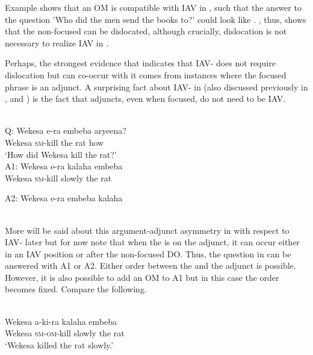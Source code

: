 \documentclass[output=paper,newtxmath,modfonts,nonflat,hidelinks]{langsci/langscibook}
\begin{document}
Example  shows that an OM is compatible with IAV  in , such that the answer to the question 'Who did the men send the books to?' could look like . , thus, shows that the non-focused  can be dislocated, although crucially, dislocation is not necessary to realize IAV  in .

Perhaps, the strongest evidence that indicates that  IAV- does not require dislocation but can co-occur with it comes from instances where the focused phrase is an adjunct. A surprising fact about IAV- in  (also discussed previously in \citet{Carstens2013}, and \citet{safirforthcoming}) is the fact that  adjuncts, even when focused, do not need to be IAV.

\ea\label{ex:selvanathan:10}
\\

Q: \gll Wekesa   e-ra     embeba   aryeena? \\
	Wekesa   \textsc{sm}{}-kill   {the rat}    how \\
\glt \-\hspace{0.5cm}`How did Wekesa kill the rat?' \\

A1: {\gll Wekesa    e-ra   kalaha   embeba \\
Wekesa   \textsc{sm}{}-kill   slowly    {the rat} \\}

A2: {\gll Wekesa    e-ra   embeba   kalaha  \\
\\}
\z

More will be said about this argument-adjunct asymmetry in  with respect to IAV- later but for now note that when the  is on the adjunct, it can occur either in an IAV position or after the non-focused DO. Thus, the question in  can be answered with A1 or A2. Either order between the  and the adjunct is possible. However, it is also possible to add an OM to A1 but in this case the order becomes fixed. Compare the following.

\ea\label{ex:selvanathan:11}
\\
\ea\label{ex:selvanathan:11a}
{\gll Wekesa  a-ki-ra   kalaha   embeba  \\
Wekesa  \textsc{sm}{}-\textsc{om}{}-kill  slowly    {the rat}\\}
\glt `Wekesa killed the rat slowly.' 
\end{document}
